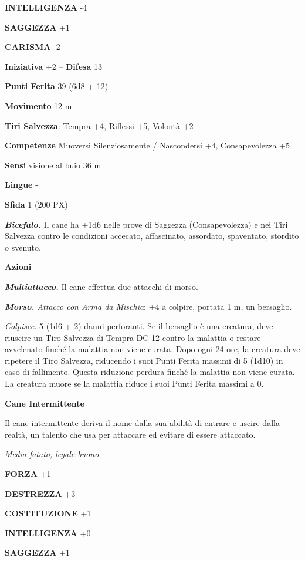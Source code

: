 \begin{multicols}{2}
	\textbf{INTELLIGENZA} -4

	\textbf{SAGGEZZA} +1

	\textbf{CARISMA} -2

	\textbf{Iniziativa} +2 -- \textbf{Difesa} 13

	\textbf{Punti Ferita} 39 (6d8 + 12)

	\textbf{Movimento} 12 m

	\textbf{Tiri Salvezza}: Tempra +4, Riflessi +5, Volontà +2

	\textbf{Competenze} Muoversi Silenziosamente / Nascondersi +4, Consapevolezza +5

	\textbf{Sensi} visione al buio 36 m

	\textbf{Lingue} -

	\textbf{Sfida} 1 (200 PX)

	\textit{\textbf{Bicefalo.}} Il cane ha +1d6 nelle prove di Saggezza (Consapevolezza) e nei Tiri Salvezza contro le condizioni accecato, affascinato, assordato, spaventato, stordito o svenuto.

	\textbf{Azioni}

	\textit{\textbf{Multiattacco.}} Il cane effettua due attacchi di morso.

	\textit{\textbf{Morso.} Attacco con Arma da Mischia}: +4 a colpire, portata 1 m, un bersaglio.

	\textit{Colpisce:} 5 (1d6 + 2) danni perforanti. Se il bersaglio è una creatura, deve riuscire un Tiro Salvezza di Tempra DC 12 contro la malattia o restare avvelenato finché la malattia non viene curata. Dopo ogni 24 ore, la creatura deve ripetere il Tiro Salvezza, riducendo i suoi Punti Ferita massimi di 5 (1d10) in caso di fallimento. Questa riduzione perdura finché la malattia non viene curata. La creatura muore se la malattia riduce i suoi Punti Ferita massimi a 0.

	\medskip\textbf{Cane Intermittente}

	Il cane intermittente deriva il nome dalla sua abilità di entrare e uscire dalla realtà, un talento che usa per attaccare ed evitare di essere attaccato.

	\textit{Media fatato, legale buono}

	\textbf{FORZA} +1

	\textbf{DESTREZZA} +3

	\textbf{COSTITUZIONE} +1

	\textbf{INTELLIGENZA} +0

	\textbf{SAGGEZZA} +1


\end{multicols}
